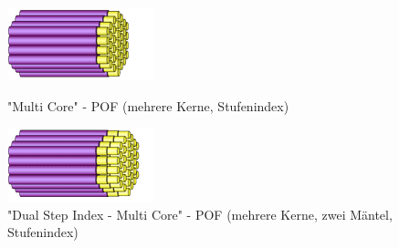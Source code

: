 \begin{figure}[h]
    \begin{center}
        \begin{minipage}[t]{0.4\textwidth}
            \begin{center}
                \includegraphics[height=0.1\textheight]{Bilder/Optische_Wellenleiter_Die_Polymer_Optische_Faser/Brechzahlprofile/pofmc.png}
                \caption["Multi
                Core" - POF (mehrere Kerne, Stufenindex) \newline
                \url{POFAC}]{"Multi
                Core" - POF (mehrere Kerne, Stufenindex)}
                \label{fig:pofmc}
            \end{center}
        \end{minipage}
        \hspace{0.025\textwidth}
        \begin{minipage}[t]{0.4\textwidth}
            \begin{center}
                \includegraphics[height=0.1\textheight]{Bilder/Optische_Wellenleiter_Die_Polymer_Optische_Faser/Brechzahlprofile/pofdsimc.png}
                \caption["Dual
                Step Index - Multi Core" - POF (mehrere Kerne,
                zwei Mäntel, Stufenindex) \newline
                \url{POFAC}]{"Dual
                Step Index - Multi Core" - POF (mehrere Kerne,
                zwei Mäntel, Stufenindex)}
                \label{fig:pofdsimc}
            \end{center}
        \end{minipage}
    \end{center}
\end{figure}

